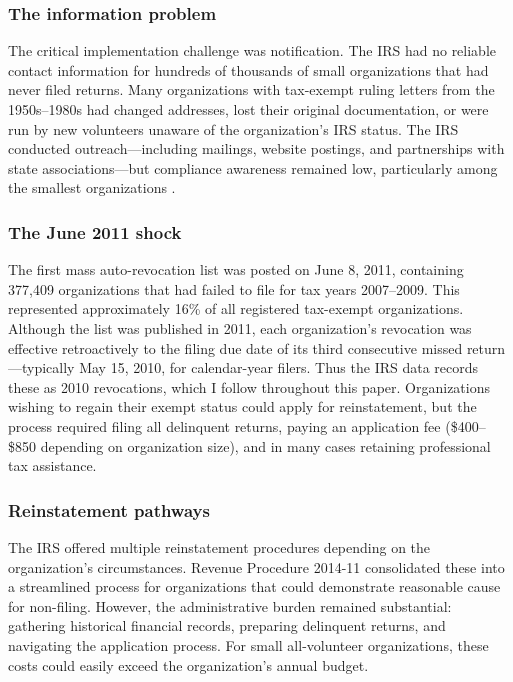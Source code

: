 \documentclass[12pt]{article}
\begin{document}
\subsubsection*{The information problem} The critical implementation challenge was notification. The IRS had no reliable contact information for hundreds of thousands of small organizations that had never filed returns. Many organizations with tax-exempt ruling letters from the 1950s--1980s had changed addresses, lost their original documentation, or were run by new volunteers unaware of the organization's IRS status. The IRS conducted outreach---including mailings, website postings, and partnerships with state associations---but compliance awareness remained low, particularly among the smallest organizations \citep{irs2010outreach}.

\subsubsection*{The June 2011 shock} The first mass auto-revocation list was posted on June 8, 2011, containing 377,409 organizations that had failed to file for tax years 2007--2009. This represented approximately 16\% of all registered tax-exempt organizations. Although the list was published in 2011, each organization's revocation was effective retroactively to the filing due date of its third consecutive missed return---typically May 15, 2010, for calendar-year filers. Thus the IRS data records these as 2010 revocations, which I follow throughout this paper. Organizations wishing to regain their exempt status could apply for reinstatement, but the process required filing all delinquent returns, paying an application fee (\$400--\$850 depending on organization size), and in many cases retaining professional tax assistance.

\subsubsection*{Reinstatement pathways} The IRS offered multiple reinstatement procedures depending on the organization's circumstances. Revenue Procedure 2014-11 consolidated these into a streamlined process for organizations that could demonstrate reasonable cause for non-filing. However, the administrative burden remained substantial: gathering historical financial records, preparing delinquent returns, and navigating the application process. For small all-volunteer organizations, these costs could easily exceed the organization's annual budget.
\end{document}
